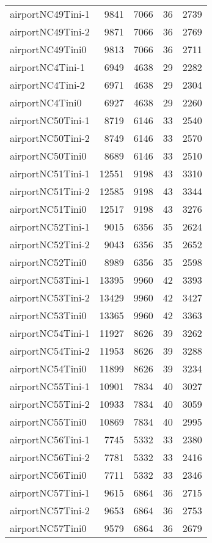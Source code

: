 \begin{longtable}{lrrrr}
airportNC49Tini-1 & 9841 & 7066 & 36 & 2739 \\
airportNC49Tini-2 & 9871 & 7066 & 36 & 2769 \\
airportNC49Tini0 & 9813 & 7066 & 36 & 2711 \\
airportNC4Tini-1 & 6949 & 4638 & 29 & 2282 \\
airportNC4Tini-2 & 6971 & 4638 & 29 & 2304 \\
airportNC4Tini0 & 6927 & 4638 & 29 & 2260 \\
airportNC50Tini-1 & 8719 & 6146 & 33 & 2540 \\
airportNC50Tini-2 & 8749 & 6146 & 33 & 2570 \\
airportNC50Tini0 & 8689 & 6146 & 33 & 2510 \\
airportNC51Tini-1 & 12551 & 9198 & 43 & 3310 \\
airportNC51Tini-2 & 12585 & 9198 & 43 & 3344 \\
airportNC51Tini0 & 12517 & 9198 & 43 & 3276 \\
airportNC52Tini-1 & 9015 & 6356 & 35 & 2624 \\
airportNC52Tini-2 & 9043 & 6356 & 35 & 2652 \\
airportNC52Tini0 & 8989 & 6356 & 35 & 2598 \\
airportNC53Tini-1 & 13395 & 9960 & 42 & 3393 \\
airportNC53Tini-2 & 13429 & 9960 & 42 & 3427 \\
airportNC53Tini0 & 13365 & 9960 & 42 & 3363 \\
airportNC54Tini-1 & 11927 & 8626 & 39 & 3262 \\
airportNC54Tini-2 & 11953 & 8626 & 39 & 3288 \\
airportNC54Tini0 & 11899 & 8626 & 39 & 3234 \\
airportNC55Tini-1 & 10901 & 7834 & 40 & 3027 \\
airportNC55Tini-2 & 10933 & 7834 & 40 & 3059 \\
airportNC55Tini0 & 10869 & 7834 & 40 & 2995 \\
airportNC56Tini-1 & 7745 & 5332 & 33 & 2380 \\
airportNC56Tini-2 & 7781 & 5332 & 33 & 2416 \\
airportNC56Tini0 & 7711 & 5332 & 33 & 2346 \\
airportNC57Tini-1 & 9615 & 6864 & 36 & 2715 \\
airportNC57Tini-2 & 9653 & 6864 & 36 & 2753 \\
airportNC57Tini0 & 9579 & 6864 & 36 & 2679 \\

\end{longtable}
